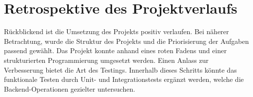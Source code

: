 \documentclass[11pt]{article}
\begin{document}
    \section{Retrospektive des Projektverlaufs}
    Rückblickend ist die Umsetzung des Projekts positiv verlaufen. Bei näherer Betrachtung, wurde die Struktur des Projekts und die Priorisierung der Aufgaben passend gewählt. Das Projekt konnte anhand eines roten Fadens und einer strukturierten Programmierung umgesetzt werden.
    Einen Anlass zur Verbesserung bietet die Art des Testings. Innerhalb dieses Schritts könnte das funktionale Testen durch Unit- und Integrationstests ergänzt werden, welche die Backend-Operationen gezielter untersuchen.  
    
    \newpage
    \printbibliography
    
    
\end{document}
